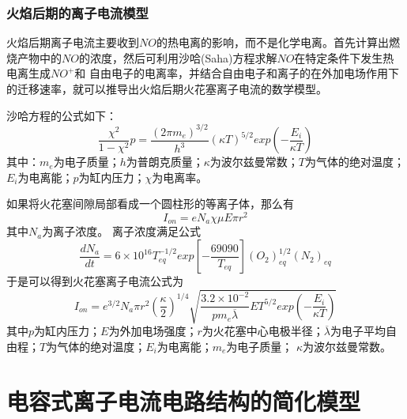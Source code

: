 \subsubsection*{火焰后期的离子电流模型}
火焰后期离子电流主要收到$NO$的热电离的影响，而不是化学电离。首先计算出燃烧产物中的$NO$的浓度，然后可利用沙哈(Saha)方程求解$NO$在特定条件下发生热电离生成$NO^{+}$和
自由电子的电离率，并结合自由电子和离子的在外加电场作用下的迁移速率，就可以推导出火焰后期火花塞离子电流的数学模型。\par
沙哈方程的公式如下：
	\begin{equation}
		\frac{\chi^{2}}{1-\chi^{2}}p=\frac{(2\pi m_{e})^{3/2}}{h^{3}}(\kappa T)^{5/2}exp(-\frac{E_{i}}{\kappa T})
	\end{equation}
其中：$m_{e}$为电子质量；$h$为普朗克质量；$\kappa$为波尔兹曼常数；$T$为气体的绝对温度；$E_{i}$为电离能；$p$为缸内压力；$\chi$为电离率。\par
如果将火花塞间隙局部看成一个圆柱形的等离子体，那么有
\begin{equation}
	I_{on}=eN_{a}\chi \mu E\pi r^{2}
\end{equation}
其中$N_{a}$为离子浓度。
离子浓度满足公式
\begin{equation}
	\frac{dN_{a}}{dt}=6\times10^{16}T_{eq}^{-1/2}exp[-\frac{69090}{T_{eq}}](O_{2})_{eq}^{1/2}(N_{2})_{eq}
\end{equation}
于是可以得到火花塞离子电流公式为
\begin{equation}
	I_{on}=e^{3/2}N_{a}\pi r^{2}(\frac{\kappa}{2})^{1/4}\sqrt{\frac{3.2\times10^{-2}}{pm_{e}\overline{\lambda}}ET^{5/2}exp(-\frac{E_{i}}{\kappa T})}
\end{equation}
其中$p$为缸内压力；$E$为外加电场强度；$r$为火花塞中心电极半径；$\overline{\lambda}$为电子平均自由程；$T$为气体的绝对温度；$E_{i}$为电离能；$m_{e}$为电子质量；
$\kappa$为波尔兹曼常数。
\section{电容式离子电流电路结构的简化模型}
